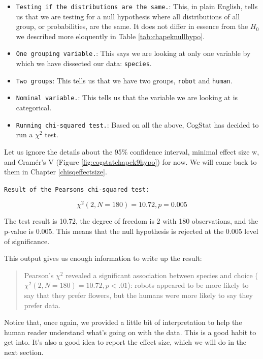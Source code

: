 \documentclass[
  11pt,
  a4paper,
  twoside,symmetric,openright]{book}
\providecommand{\tightlist}{%
  \setlength{\itemsep}{0pt}\setlength{\parskip}{0pt}}
\theoremstyle{break}
\theoremstyle{break}
\begin{document}
\begin{itemize}
\tightlist
\item
  \texttt{Testing\ if\ the\ distributions\ are\ the\ same.}: This, in plain English, tells us that we are testing for a null hypothesis where all distributions of all group, or probabilities, are the same. It does not differ in essence from the \(H_0\) we described more eloquently in Table \ref{tab:chapeknullhypo}.
\item
  \texttt{One\ grouping\ variable.}: This says we are looking at only one variable by which we have dissected our data: \texttt{species}.
\item
  \texttt{Two\ groups}: This tells us that we have two groups, \texttt{robot} and \texttt{human}.
\item
  \texttt{Nominal\ variable.}: This tells us that the variable we are looking at is categorical.
\item
  \texttt{Running\ chi-squared\ test.}: Based on all the above, CogStat has decided to run a \(\chi^2\) test.
\end{itemize}

Let us ignore the details about the 95\% confidence interval, minimal effect size w, and Cramér's V (Figure \ref{fig:cogstatchapek9hypo}) for now. We will come back to them in Chapter \ref{chisqeffectsize}.

\texttt{Result\ of\ the\ Pearson\textquotesingle{}s\ chi-squared\ test:}

\[
\chi^2(2, N = 180) = 10.72, p = 0.005
\]

The test result is 10.72, the degree of freedom is 2 with 180 observations, and the p-value is 0.005. This means that the null hypothesis is rejected at the 0.005 level of significance.

This output gives us enough information to write up the result:

\begin{quote}
Pearson's \(\chi^2\) revealed a significant association between species and choice (\(\chi^2(2, N = 180) = 10.72, p < .01\)): robots appeared to be more likely to say that they prefer flowers, but the humans were more likely to say they prefer data.
\end{quote}

Notice that, once again, we provided a little bit of interpretation to help the human reader understand what's going on with the data. This is a good habit to get into. It's also a good idea to report the effect size, which we will do in the next section.
\end{document}
